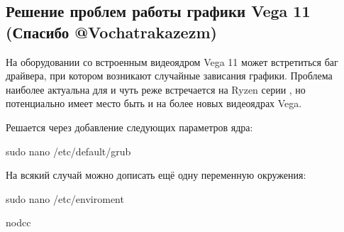 \documentclass[letterpaper,10pt,russian,openany]{sphinxmanual}
\begin{document}
\sphinxAtStartPar
{}

\sphinxAtStartPar
{}

\ignorespaces 

\subsection{Решение проблем работы графики Vega 11 (Спасибо @Vochatrak\sphinxhyphen{}az\sphinxhyphen{}ezm)}
\label{\detokenize{source/generic-system-acceleration:vega-11-vochatrak-az-ezm}}\label{\detokenize{source/generic-system-acceleration:bug-solution-for-vega}}\label{\detokenize{source/generic-system-acceleration:index-13}}
\sphinxAtStartPar
На оборудовании со встроенным видеоядром Vega 11 может встретиться баг драйвера, при котором возникают случайные зависания графики.
Проблема наиболее актуальна для  и чуть реже встречается на Ryzen серии , но потенциально имеет место быть и на более
новых видеоядрах Vega.

\sphinxAtStartPar
Решается через добавление следующих параметров ядра:

\begin{sphinxVerbatim}[commandchars=\\\{\}]
sudo nano /etc/default/grub

\end{sphinxVerbatim}

\sphinxAtStartPar
На всякий случай можно дописать ещё одну переменную окружения:

\begin{sphinxVerbatim}[commandchars=\\\{\}]
sudo nano /etc/enviroment

nodcc
\end{sphinxVerbatim}
\end{document}
